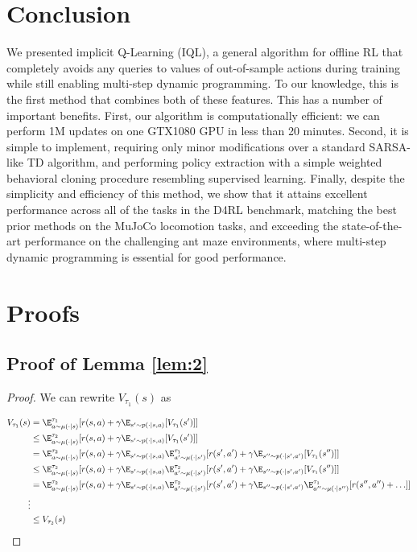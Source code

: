 \documentclass{article} %
\def\ourname{IQL\xspace}
\begin{document}
\section{Conclusion}

We presented implicit Q-Learning (\ourname), a general algorithm for offline RL that completely avoids any queries to values of out-of-sample actions during training while still enabling multi-step dynamic programming. To our knowledge, this is the first method that combines both of these features. This has a number of important benefits. First, our algorithm is computationally efficient: we can perform 1M updates on one GTX1080 GPU in less than 20 minutes. Second, it is simple to implement, requiring only minor modifications over a standard SARSA-like TD algorithm, and performing policy extraction with a simple weighted behavioral cloning procedure resembling supervised learning. 
Finally, despite the simplicity and efficiency of this method, we show that it attains excellent performance across all of the tasks in the D4RL benchmark, matching the best prior methods on the MuJoCo locomotion tasks, and exceeding the state-of-the-art performance on the challenging ant maze environments, where multi-step dynamic programming is essential for good performance.





\newpage
\appendix

\section{Proofs}

\label{app:proofs}
\subsection{Proof of Lemma \ref{lem:2}}
\begin{proof}
We can rewrite $V_{\tau_1}(s)$ as 

\begin{align*}
    V_{\tau_1}(s) &= \E^{\tau_1}_{a\sim\mu(\cdot|s)}[r(s,a)+\gamma\E_{s'\sim p(\cdot|s,a)}[V_{\tau_1}(s')]] \\
    & \le \E^{\tau_2}_{a\sim\mu(\cdot|s)}[r(s,a)+\gamma\E_{s'\sim p(\cdot|s,a)}[V_{\tau_1}(s')]] \\
    & = \E^{\tau_2}_{a\sim\mu(\cdot|s)}[r(s,a)+\gamma\E_{s'\sim p(\cdot|s,a)}\E^{\tau_1}_{a'\sim\mu(\cdot|s')}[r(s',a')+\gamma\E_{s''\sim p(\cdot|s',a')}[V_{\tau_1}(s'')]] \\
    & \le \E^{\tau_2}_{a\sim\mu(\cdot|s)}[r(s,a)+\gamma\E_{s'\sim p(\cdot|s,a)}\E^{\tau_2}_{a'\sim\mu(\cdot|s')}[r(s',a')+\gamma\E_{s''\sim p(\cdot|s',a')}[V_{\tau_1}(s'')]] \\
    & = \E^{\tau_2}_{a\sim\mu(\cdot|s)}[r(s,a)+\gamma\E_{s'\sim p(\cdot|s,a)}\E^{\tau_2}_{a'\sim\mu(\cdot|s')}[r(s',a')+\gamma\E_{s''\sim p(\cdot|s',a')}\E^{\tau_1}_{a''\sim\mu(\cdot|s'')}[r(s'', a'')+\ldots]] \\
    \vdots \\
    &\le V_{\tau_2}(s)
\end{align*}
\end{proof}
\end{document}

